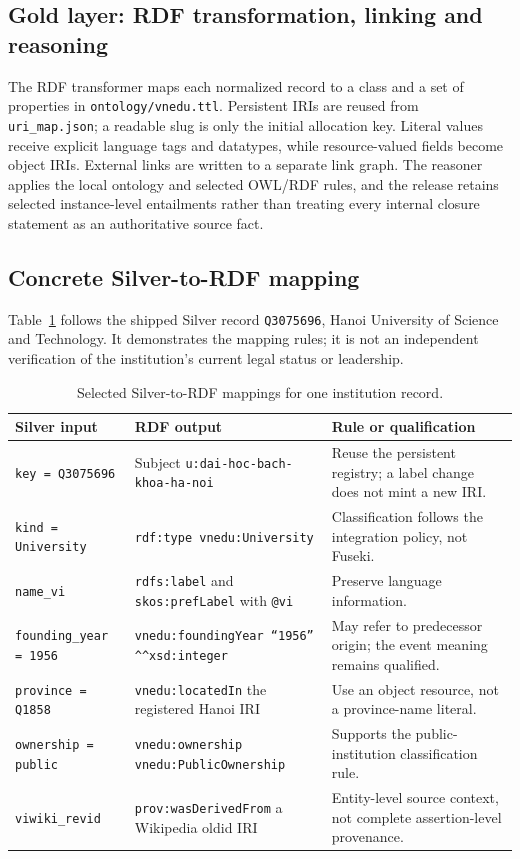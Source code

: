 \subsection{Gold layer: RDF transformation, linking and reasoning}
The RDF transformer maps each normalized record to a class and a set of properties in
\texttt{ontology/vnedu.ttl}. Persistent IRIs are reused from \texttt{uri\_map.json}; a readable
slug is only the initial allocation key. Literal values receive explicit language tags and
datatypes, while resource-valued fields become object IRIs. External links are written to a
separate link graph. The reasoner applies the local ontology and selected OWL/RDF rules, and
the release retains selected instance-level entailments rather than treating every internal
closure statement as an authoritative source fact.

\subsection{Concrete Silver-to-RDF mapping}
Table~\ref{tab:mapping} follows the shipped Silver record \texttt{Q3075696}, Hanoi University
of Science and Technology. It demonstrates the mapping rules; it is not an independent
verification of the institution's current legal status or leadership.

\begin{table}[htbp]\centering\small
\caption{Selected Silver-to-RDF mappings for one institution record.}\label{tab:mapping}
\begin{tabularx}{\textwidth}{p{3.3cm}Xp{4.4cm}}\toprule
Silver input & RDF output & Rule or qualification \\\midrule
\texttt{key = Q3075696} & Subject \texttt{u:dai-hoc-bach-khoa-ha-noi} & Reuse the persistent registry; a label change does not mint a new IRI. \\
\texttt{kind = University} & \texttt{rdf:type vnedu:University} & Classification follows the integration policy, not Fuseki. \\
\texttt{name\_vi} & \texttt{rdfs:label} and \texttt{skos:prefLabel} with \texttt{@vi} & Preserve language information. \\
\texttt{founding\_year = 1956} & \texttt{vnedu:foundingYear ``1956'' \textasciicircum\textasciicircum xsd:integer} & May refer to predecessor origin; the event meaning remains qualified. \\
\texttt{province = Q1858} & \texttt{vnedu:locatedIn} the registered Hanoi IRI & Use an object resource, not a province-name literal. \\
\texttt{ownership = public} & \texttt{vnedu:ownership vnedu:PublicOwnership} & Supports the public-institution classification rule. \\
\texttt{viwiki\_revid} & \texttt{prov:wasDerivedFrom} a Wikipedia oldid IRI & Entity-level source context, not complete assertion-level provenance. \\
\bottomrule
\end{tabularx}
\end{table}

